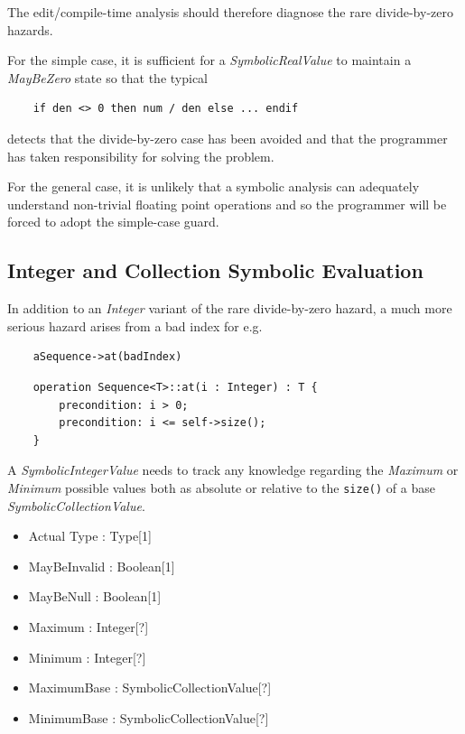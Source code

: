 \documentclass[
]{ceurart}
\begin{document}
The edit/compile-time analysis should therefore diagnose the rare divide-by-zero hazards.

For the simple case, it is sufficient for a \emph{SymbolicRealValue} to maintain a \emph{MayBeZero} state so that the typical

\begin{verbatim}
    if den <> 0 then num / den else ... endif
\end{verbatim}

detects that the divide-by-zero case has been avoided and that the programmer has taken responsibility for solving the problem.

For the general case, it is unlikely that a symbolic analysis can adequately understand non-trivial floating point operations and so the programmer will be forced to adopt the simple-case guard.

\subsection{Integer and Collection Symbolic Evaluation}

In addition to an \emph{Integer} variant of the rare divide-by-zero hazard, a much more serious hazard arises from a bad index for e.g.

\begin{verbatim}
    aSequence->at(badIndex)
\end{verbatim}

\begin{verbatim}
    operation Sequence<T>::at(i : Integer) : T {
        precondition: i > 0;
        precondition: i <= self->size();
    }
\end{verbatim}

A \emph{SymbolicIntegerValue} needs to track any knowledge regarding the \emph{Maximum} or \emph{Minimum} possible values both as absolute or relative to the \verb|size()| of a base \emph{SymbolicCollectionValue}. 

\begin{itemize}
	\item Actual Type : Type[1]
	\item MayBeInvalid : Boolean[1]
	\item MayBeNull : Boolean[1]
    \item Maximum : Integer[?]
	\item Minimum : Integer[?]
    \item MaximumBase : SymbolicCollectionValue[?]
    \item MinimumBase : SymbolicCollectionValue[?]
\end{itemize}  
\end{document}
